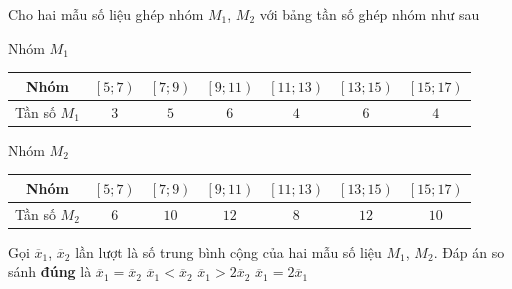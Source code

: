 \begin{ex}%
	Cho hai mẫu số liệu ghép nhóm $M_1$, $M_2$ với bảng tần số ghép nhóm như sau
	\begin{center}
		Nhóm $M_1$
		\begin{tabular}{|c|c|c|c|c|c|c|}
			\hline
			Nhóm & $\left[5;7\right)$ &$\left[7;9\right)$ &$\left[9;11\right)$ &$\left[11;13\right)$ &$\left[13;15\right)$ &$\left[15;17\right)$ \\
			\hline
			Tần số $M_1$ & $3$ & $5$ & $6$ & $4$ & $6$ & $4$ \\
			\hline
		\end{tabular}
	\end{center}
	
	\begin{center}
		Nhóm $M_2$
		\begin{tabular}{|c|c|c|c|c|c|c|}
			\hline
			Nhóm & $\left[5;7\right)$ &$\left[7;9\right)$ &$\left[9;11\right)$ &$\left[11;13\right)$ &$\left[13;15\right)$ &$\left[15;17\right)$ \\
			\hline
			Tần số $M_2$ & $6$ & $10$ & $12$ & $8$ & $12$ & $10$ \\
			\hline
		\end{tabular}
	\end{center}
	Gọi $\overline{x}_1$, $\overline{x}_2$ lần lượt là số trung bình cộng của hai mẫu số liệu $M_1$, $M_2$. Đáp án so sánh \textbf{đúng} là
	\choice
	{$\overline{x}_1=\overline{x}_2$}
	{\True $\overline{x}_1<\overline{x}_2$}
	{$\overline{x}_1>2\overline{x}_2$}
	{$\overline{x}_1=2\overline{x}_1$}
\end{ex}

